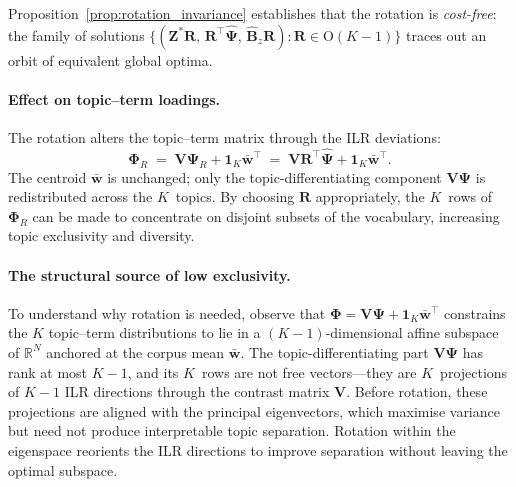 \noindent
Proposition~\ref{prop:rotation_invariance} establishes that the
rotation is \emph{cost-free}: the family of solutions
$\{(\mathbf{Z}^*\mathbf{R},\,\mathbf{R}^{\!\top}\hat{\boldsymbol{\Psi}},\,
\hat{\mathbf{B}}_z\mathbf{R}):\mathbf{R}\in\mathrm{O}(K{-}1)\}$ traces
out an orbit of equivalent global optima.
 
\paragraph{Effect on topic--term loadings.}
The rotation alters the topic--term matrix through the ILR deviations:
\begin{equation}
  \boldsymbol{\Phi}_R
  \;=\;
  \mathbf{V}\boldsymbol{\Psi}_R
  + \mathbf{1}_K\bar{\mathbf{w}}^{\!\top}
  \;=\;
  \mathbf{V}\mathbf{R}^{\!\top}\hat{\boldsymbol{\Psi}}
  + \mathbf{1}_K\bar{\mathbf{w}}^{\!\top}.
  \label{eq:Phi_rotated}
\end{equation}
The centroid $\bar{\mathbf{w}}$ is unchanged; only the
topic-differentiating component $\mathbf{V}\boldsymbol{\Psi}$ is
redistributed across the $K$~topics. By choosing $\mathbf{R}$
appropriately, the $K$~rows of $\boldsymbol{\Phi}_R$ can be made to
concentrate on disjoint subsets of the vocabulary, increasing topic
exclusivity and diversity.
 
\paragraph{The structural source of low exclusivity.}
To understand why rotation is needed, observe that
$\boldsymbol{\Phi} = \mathbf{V}\boldsymbol{\Psi}
+ \mathbf{1}_K\bar{\mathbf{w}}^{\!\top}$ constrains
the $K$ topic--term distributions to lie in a $(K{-}1)$-dimensional
affine subspace of $\mathbb{R}^N$ anchored at the corpus mean
$\bar{\mathbf{w}}$. The topic-differentiating part
$\mathbf{V}\boldsymbol{\Psi}$ has rank at most $K{-}1$, and its
$K$~rows are not free vectors---they are
$K$~projections of $K{-}1$ ILR directions through the contrast matrix
$\mathbf{V}$. Before rotation, these projections are aligned with the
principal eigenvectors, which maximise variance but need not produce
interpretable topic separation. Rotation within the eigenspace
reorients the ILR directions to improve separation
without leaving the optimal subspace.
 
